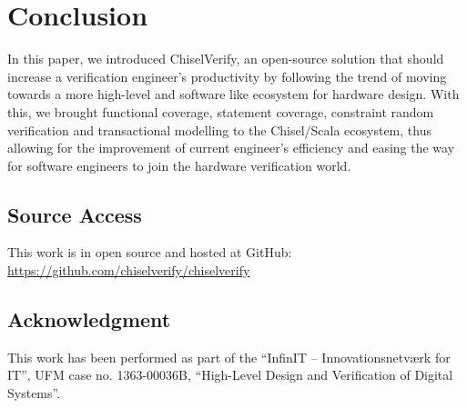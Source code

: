 \documentclass[runningheads]{llncs}
\begin{document}
\section{Conclusion}
In this paper, we introduced ChiselVerify, an open-source solution that should increase a verification engineer's productivity by following the trend of moving towards a more high-level and software like ecosystem for hardware design. With this, we brought functional coverage, statement coverage, constraint random verification and transactional modelling to the Chisel/Scala ecosystem, thus allowing for the improvement of current engineer's efficiency and easing the way for software engineers to join the hardware verification world.

\subsection*{Source Access}

This work is in open source and hosted at GitHub: \url{https://github.com/chiselverify/chiselverify}

\subsection*{Acknowledgment}

This work has been performed as part of the
``InfinIT -- Innovationsnetv{\ae}rk for IT'', UFM case no. 1363-00036B,
``High-Level Design and Verification of Digital Systems''.



\end{document}
